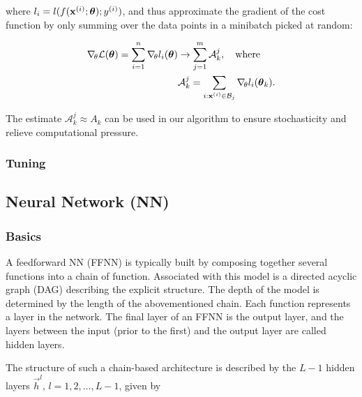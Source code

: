         where $l_i = l(f(\mathbf{x}^{(i)};\boldsymbol{\theta}); y^{(i)})$, and thus approximate the gradient of the cost function by only summing over the data points in a minibatch picked at random:
        
        \begin{equation}\label{eq:sgd_gradient}
            \begin{split}
            \nabla_{\!\theta} \mathcal{L}(\boldsymbol{\theta}) = \sum_{i=1}^n \nabla_{\!\theta}l_i(\boldsymbol{\theta}) &\to \sum_{j=1}^{m}\mathcal{A}_k^j, \quad \mathrm{where} \\
            &\mathcal{A}^j_k = \sum_{i:\mathbf{x}^{(i)} \in\mathcal{B}_j }\nabla_{\!\theta} l_i(\boldsymbol{\theta}_k).
            \end{split}
        \end{equation}

        The estimate $\mathcal{A}_k^j \approx A_k$ can be used in our algorithm to ensure stochasticity and relieve  computational pressure.
    
    \subsubsection{Tuning}\label{sec:tuning}

\subsection{Neural Network (NN)}\label{sec:neural_network}

    \subsubsection{Basics}\label{sec:basics}

    A feedforward NN (FFNN) is typically built by composing together several functions into a chain of function. Associated with this model is a directed acyclic graph (DAG) describing the explicit structure. The depth of the model is determined by the length of the abovementioned chain. Each function represents a layer in the network. The final layer of an FFNN is the output layer, and the layers between the input (prior to the first) and the output layer are called hidden layers. \citep{Goodfellow2016}

    The structure of such a chain-based architecture is described by the $L-1$ hidden layers $\vec{h}^l,\,l=1,2, \dots, L-1$, given by

